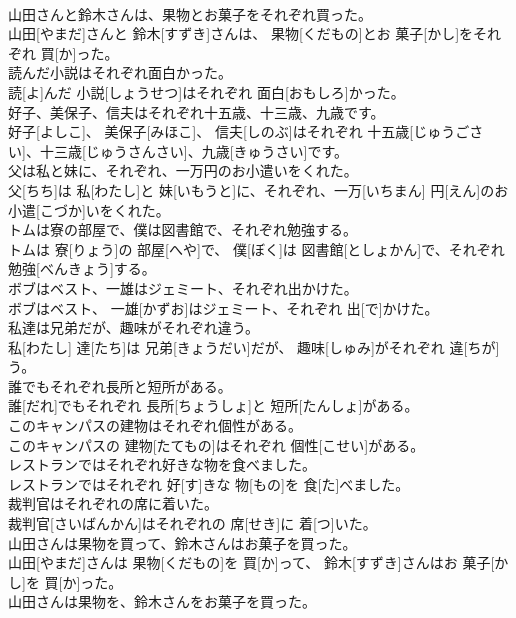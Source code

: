 \documentclass[8pt]{extreport}
\begin{document}
\begin{CJK}{UTF8}{min}
\\	山田さんと鈴木さんは、果物とお菓子をそれぞれ買った。	
\\	山田[やまだ]さんと 鈴木[すずき]さんは、 果物[くだもの]とお 菓子[かし]をそれぞれ 買[か]った。
\\	読んだ小説はそれぞれ面白かった。	
\\	読[よ]んだ 小説[しょうせつ]はそれぞれ 面白[おもしろ]かった。
\\	好子、美保子、信夫はそれぞれ十五歳、十三歳、九歳です。	
\\	好子[よしこ]、 美保子[みほこ]、 信夫[しのぶ]はそれぞれ 十五歳[じゅうごさい]、十三歳[じゅうさんさい]、九歳[きゅうさい]です。
\\	父は私と妹に、それぞれ、一万円のお小遣いをくれた。	
\\	父[ちち]は 私[わたし]と 妹[いもうと]に、それぞれ、一万[いちまん] 円[えん]のお 小遣[こづか]いをくれた。
\\	トムは寮の部屋で、僕は図書館で、それぞれ勉強する。	
\\	トムは 寮[りょう]の 部屋[へや]で、 僕[ぼく]は 図書館[としょかん]で、それぞれ 勉強[べんきょう]する。
\\	ボブはベスト、一雄はジェミート、それぞれ出かけた。	
\\	ボブはベスト、 一雄[かずお]はジェミート、それぞれ 出[で]かけた。
\\	私達は兄弟だが、趣味がそれぞれ違う。	
\\	私[わたし] 達[たち]は 兄弟[きょうだい]だが、 趣味[しゅみ]がそれぞれ 違[ちが]う。
\\	誰でもそれぞれ長所と短所がある。	
\\	誰[だれ]でもそれぞれ 長所[ちょうしょ]と 短所[たんしょ]がある。
\\	このキャンパスの建物はそれぞれ個性がある。	
\\	このキャンパスの 建物[たてもの]はそれぞれ 個性[こせい]がある。
\\	レストランではそれぞれ好きな物を食べました。	
\\	レストランではそれぞれ 好[す]きな 物[もの]を 食[た]べました。
\\	裁判官はそれぞれの席に着いた。	
\\	裁判官[さいばんかん]はそれぞれの 席[せき]に 着[つ]いた。
\\	山田さんは果物を買って、鈴木さんはお菓子を買った。	
\\	山田[やまだ]さんは 果物[くだもの]を 買[か]って、 鈴木[すずき]さんはお 菓子[かし]を 買[か]った。
\\	山田さんは果物を、鈴木さんをお菓子を買った。	

\end{CJK}
\end{document}
